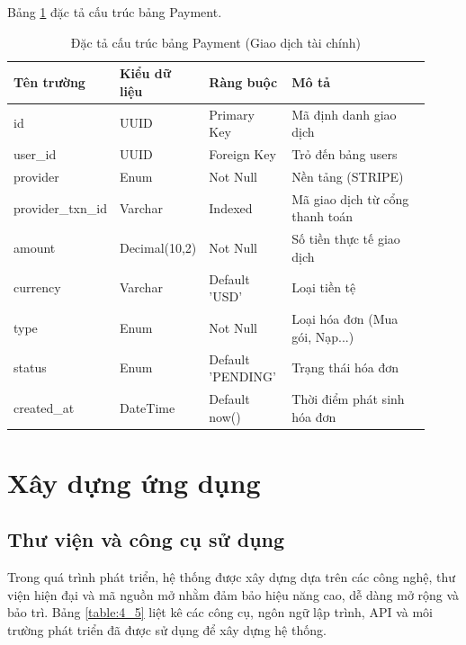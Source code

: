 Bảng \ref{table:4_4} đặc tả cấu trúc bảng Payment.
\begin{table}[h!]
    \caption{Đặc tả cấu trúc bảng Payment (Giao dịch tài chính)}
    \label{table:4_4}
\centering
\small
\renewcommand{\arraystretch}{1.2}
\begin{tabular}{|p{0.2\linewidth}|p{0.15\linewidth}|p{0.2\linewidth}|p{0.37\linewidth}|}
\hline
\textbf{Tên trường} & \textbf{Kiểu dữ liệu} & \textbf{Ràng buộc} & \textbf{Mô tả} \\ \hline
id & UUID & Primary Key & Mã định danh giao dịch \\ \hline
user\_id & UUID & Foreign Key & Trỏ đến bảng users \\ \hline
provider & Enum & Not Null & Nền tảng (STRIPE) \\ \hline
provider\_txn\_id & Varchar & Indexed & Mã giao dịch từ cổng thanh toán \\ \hline
amount & Decimal(10,2) & Not Null & Số tiền thực tế giao dịch \\ \hline
currency & Varchar & Default 'USD' & Loại tiền tệ \\ \hline
type & Enum & Not Null & Loại hóa đơn (Mua gói, Nạp...) \\ \hline
status & Enum & Default 'PENDING' & Trạng thái hóa đơn \\ \hline
created\_at & DateTime & Default now() & Thời điểm phát sinh hóa đơn \\ \hline
\end{tabular}
\end{table}
\FloatBarrier


\section{Xây dựng ứng dụng}

\subsection{Thư viện và công cụ sử dụng}
Trong quá trình phát triển, hệ thống được xây dựng dựa trên các công nghệ, thư viện hiện đại và mã nguồn mở nhằm đảm bảo hiệu năng cao, dễ dàng mở rộng và bảo trì. Bảng \ref{table:4_5} liệt kê các công cụ, ngôn ngữ lập trình, API và môi trường phát triển đã được sử dụng để xây dựng hệ thống.

